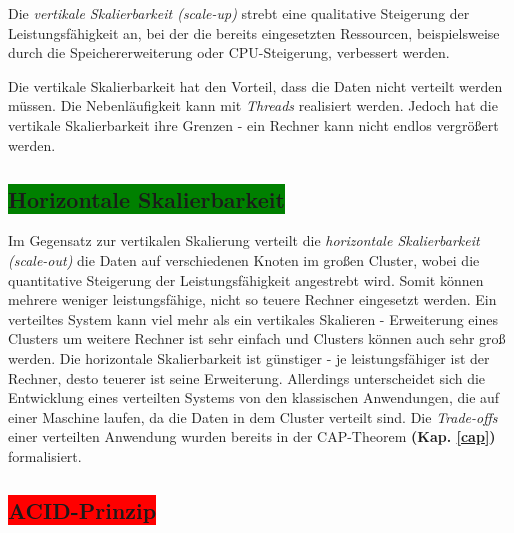 Die \textit{vertikale Skalierbarkeit (scale-up)} strebt eine qualitative Steigerung der Leistungsfähigkeit an, bei der die bereits eingesetzten Ressourcen, beispielsweise durch die Speichererweiterung oder CPU-Steigerung, verbessert werden.

Die vertikale Skalierbarkeit hat den Vorteil, dass die Daten nicht verteilt werden müssen. Die Nebenläufigkeit kann mit \textit{Threads} realisiert werden. Jedoch hat die vertikale Skalierbarkeit ihre Grenzen - ein Rechner kann nicht endlos vergrößert werden. 

\subsection{\colorbox{green}{Horizontale Skalierbarkeit}}

Im Gegensatz zur vertikalen Skalierung verteilt die \textit{horizontale Skalierbarkeit (scale-out)} die Daten auf verschiedenen Knoten im großen Cluster, wobei die quantitative Steigerung der Leistungsfähigkeit angestrebt wird. Somit können mehrere weniger leistungsfähige, nicht so teuere Rechner eingesetzt werden. %
Ein verteiltes System kann viel mehr als ein vertikales Skalieren - Erweiterung eines Clusters um weitere Rechner ist sehr einfach und Clusters können auch sehr groß werden. Die horizontale Skalierbarkeit ist günstiger - je leistungsfähiger ist der Rechner, desto teuerer ist seine Erweiterung. Allerdings unterscheidet sich die Entwicklung eines verteilten Systems von den klassischen Anwendungen, die auf einer Maschine laufen, da die Daten in dem Cluster verteilt sind. Die \textit{Trade-offs} einer verteilten Anwendung wurden bereits in der CAP-Theorem \textbf{(Kap. \ref{cap})}  formalisiert.

\subsection{\colorbox{red}{ACID-Prinzip}}\label{acid}

